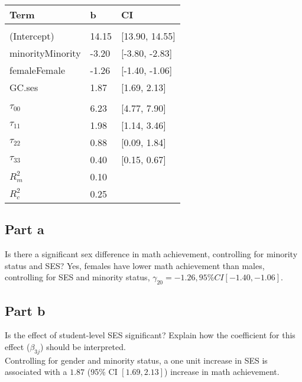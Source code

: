 \documentclass[]{article}
\begin{document}
\begin{table}[H]
\centering
\begin{tabular}{lll}
\toprule
Term & b & CI\\
\midrule
\addlinespace[0.3em]
\multicolumn{3}{l}{\textbf{Fixed}}\\
\hspace{1em}(Intercept) & 14.15 & [13.90, 14.55]\\
\hspace{1em}minorityMinority & -3.20 & [-3.80, -2.83]\\
\hspace{1em}femaleFemale & -1.26 & [-1.40, -1.06]\\
\hspace{1em}GC.ses & 1.87 & [1.69, 2.13]\\
\addlinespace[0.3em]
\multicolumn{3}{l}{\textbf{Random}}\\
\hspace{1em}$\tau_{00}$ & 6.23 & [4.77, 7.90]\\
\hspace{1em}$\tau_{11}$ & 1.98 & [1.14, 3.46]\\
\hspace{1em}$\tau_{22}$ & 0.88 & [0.09, 1.84]\\
\hspace{1em}$\tau_{33}$ & 0.40 & [0.15, 0.67]\\
$R^2_m$ & 0.10 & \\
$R^2_c$ & 0.25 & \\
\bottomrule
\end{tabular}
\end{table}

\subsection{Part a}\label{part-a-1}

Is there a significant sex difference in math achievement, controlling
for minority status and SES? Yes, females have lower math achievement
than males, controlling for SES and minority status,
\(\gamma_{20} = -1.26, 95\% CI [-1.40, -1.06]\).

\subsection{Part b}\label{part-b-1}

Is the effect of student-level SES significant? Explain how the
coefficient for this effect (\(\beta_{3j}\)) should be interpreted.\\
Controlling for gender and minority status, a one unit increase in SES
is associated with a \(1.87\) (95\% CI \([1.69, 2.13]\)) increase in
math achievement.
\end{document}
